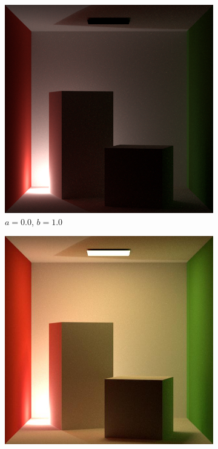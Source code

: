 \begin{figure}[ht]
\begin{subfigure}[b]{0.24\textwidth}
        \includegraphics[width=\textwidth]{images/02-linear_lt_light02.jpg}
        \caption*{\(a = 0.0\), \(b = 1.0\)}
    \end{subfigure}
    \hfill
    \begin{subfigure}[b]{0.24\textwidth}
        \centering
        \includegraphics[width=\textwidth]{images/02-linear_lt_comb.jpg}

\end{subfigure}
\end{figure}
